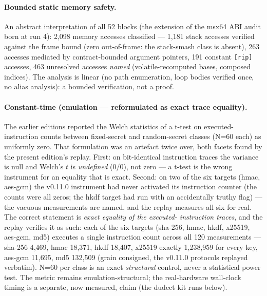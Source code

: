\documentclass[11pt,a4paper]{article}
\newcommand{\code}[1]{\texttt{\small #1}}
\begin{document}
\paragraph{Bounded static memory safety.} An abstract interpretation of
all 52 blocks (the extension of the msx64 ABI audit born at run 4):
2{,}098 memory accesses classified --- 1{,}181 stack accesses verified
against the frame bound (zero out-of-frame: the stack-smash class is
absent), 263 accesses mediated by contract-bounded argument pointers, 191
constant \code{[rip]} accesses, 463 unresolved accesses \emph{named}
(volatile-recomputed bases, composed indices). The analysis is linear
(no path enumeration, loop bodies verified once, no alias analysis): a
bounded verification, not a proof.

\paragraph{Constant-time (emulation --- reformulated as exact trace equality).}
The earlier editions reported the Welch statistics of a t-test on
executed-instruction counts between fixed-secret and random-secret
classes (N=60 each) as uniformly zero. That formulation was an artefact
twice over, both
facets found by the present edition's replay. First: on bit-identical
instruction traces the variance is null and Welch's $t$ is \emph{undefined}
(0/0), not zero --- a t-test is the wrong instrument for an equality that
is exact. Second: on two of the six targets (hmac, aes-gcm) the v0.11.0
instrument had never activated its instruction counter (the counts were
all zeros; the hkdf target had run with an accidentally truthy flag) ---
the vacuous measurements are named, and the replay measures all six for
real. The correct statement is \emph{exact equality of the executed-
instruction traces}, and the replay verifies it as such: each of the six
targets (sha-256, hmac, hkdf, x25519, aes-gcm, md5) executes a single
instruction count across all 120 measurements --- sha-256 4{,}469, hmac
18{,}371, hkdf 18{,}407, x25519 exactly 1{,}238{,}959 for every key,
aes-gcm 11{,}695, md5 132{,}509 (grain consigned, the v0.11.0 protocols
replayed verbatim). N=60 per class is an exact \emph{structural}
control, never a statistical power test. The metric remains
emulation-structural; the real-hardware wall-clock timing is a separate,
now measured, claim (the dudect kit runs below).
\end{document}
